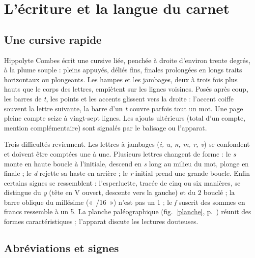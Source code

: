 \section{L'écriture et la langue du carnet}

\subsection{Une cursive rapide}

Hippolyte Combes écrit une cursive liée, penchée à droite d'environ trente degrés, à la plume souple : pleins appuyés, déliés fins, finales prolongées en longs traits horizontaux ou plongeants. Les hampes et les jambages, deux à trois fois plus hauts que le corps des lettres, empiètent sur les lignes voisines. Posés après coup, les barres de \textit{t}, les points et les accents glissent vers la droite : l'accent coiffe souvent la lettre suivante, la barre d'un \textit{t} couvre parfois tout un mot. Une page pleine compte seize à vingt-sept lignes. Les ajouts ultérieurs (total d'un compte, mention complémentaire) sont signalés par le balisage ou l'apparat.

Trois difficultés reviennent. Les lettres à jambages (\textit{i, u, n, m, r, v}) se confondent et doivent être comptées une à une. Plusieurs lettres changent de forme : le \textit{s} monte en haute boucle à l'initiale, descend en \textit{s} long au milieu du mot, plonge en finale ; le \textit{d} rejette sa haste en arrière ; le \textit{r} initial prend une grande boucle. Enfin certains signes se ressemblent : l'esperluette, tracée de cinq ou six manières, se distingue du \textit{y} (tête en V ouvert, descente vers la gauche) et du 2 bouclé ; la barre oblique du millésime («~/16~») n'est pas un 1 ; le \textit{f} suscrit des sommes en francs ressemble à un 5. La planche paléographique (fig.~\ref{planche}, p.~\pageref{planche}) réunit des formes caractéristiques ; l'apparat discute les lectures douteuses.

\subsection{Abréviations et signes}

